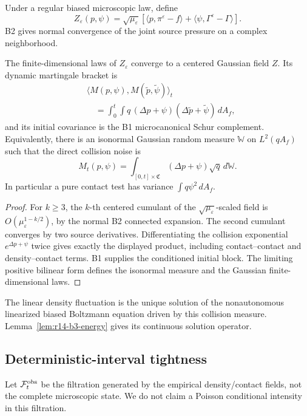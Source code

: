 Under a regular biased microscopic law, define
\[
 Z_\varepsilon(p,\psi)
 =
 \sqrt{\mu_\varepsilon}
 \left[
 \langle p,\pi^\varepsilon-f\rangle
 +\langle\psi,\Gamma^\varepsilon-\Gamma\rangle
 \right].
\]
B2 gives normal convergence of the joint source pressure on a complex
neighborhood.

\begin{theorem}
\label{thm:r14-b3-covariance}
The finite-dimensional laws of \(Z_\varepsilon\) converge to a centered
Gaussian field \(Z\).  Its dynamic martingale bracket is
\[
 \begin{aligned}
 &\langle M(p,\psi),M(\tilde p,\tilde\psi)\rangle_t\\
 &\quad=
 \int_0^t\int
 q\,(\Delta p+\psi)(\Delta\tilde p+\tilde\psi)\,dA_f ,
 \end{aligned}
\]
and its initial covariance is the B1 microcanonical Schur complement.
Equivalently, there is an isonormal Gaussian random measure
\(\mathbb W\) on \(L^2(qA_f)\) such that the direct collision noise is
\[
 M_t(p,\psi)=
 \int_{[0,t]\times\mathfrak C}
 (\Delta p+\psi)\sqrt q\,d\mathbb W .
\]
In particular a pure contact test has variance
\(\int q\psi^2\,dA_f\).
\end{theorem}

\begin{proof}
For \(k\ge3\), the \(k\)-th centered cumulant of the
\(\sqrt{\mu_\varepsilon}\)-scaled field is
\(O(\mu_\varepsilon^{1-k/2})\), by the normal B2 connected expansion.
The second cumulant converges by two source derivatives.  Differentiating the
collision exponential
\(e^{\Delta p+\psi}\) twice gives exactly the displayed product, including
contact--contact and density--contact terms.  B1 supplies the conditioned
initial block.  The limiting positive bilinear form defines the isonormal
measure and the Gaussian finite-dimensional laws.
\end{proof}

The linear density fluctuation is the unique solution of the nonautonomous
linearized biased Boltzmann equation driven by this collision measure.
Lemma~\ref{lem:r14-b3-energy} gives its continuous solution operator.

\subsection{Deterministic-interval tightness}

Let \(\mathcal F_t^{\rm obs}\) be the filtration generated by the empirical
density/contact fields, not the complete microscopic state.  We do not claim
a Poisson conditional intensity in this filtration.

